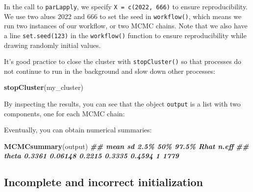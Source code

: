 \documentclass[
  12pt,
]{krantz}
\newenvironment{Shaded}{\begin{snugshade}}{\end{snugshade}}
\newcommand{\DocumentationTok}[1]{\textcolor[rgb]{0.56,0.35,0.01}{\textbf{\textit{#1}}}}
\newcommand{\FunctionTok}[1]{\textcolor[rgb]{0.13,0.29,0.53}{\textbf{#1}}}
\newcommand{\NormalTok}[1]{#1}
\begin{document}
In the call to \texttt{parLapply}, we specify \texttt{X\ =\ c(2022,\ 666)} to ensure reproducibility. We use two alues 2022 and 666 to set the seed in \texttt{workflow()}, which means we run two instances of our workflow, or two MCMC chains. Note that we also have a line \texttt{set.seed(123)} in the \texttt{workflow()} function to ensure reproducibility while drawing randomly initial values.

It's good practice to close the cluster with \texttt{stopCluster()} so that processes do not continue to run in the background and slow down other processes:

\begin{Shaded}
\begin{Highlighting}[]
\FunctionTok{stopCluster}\NormalTok{(my\_cluster)}
\end{Highlighting}
\end{Shaded}

By inspecting the results, you can see that the object \texttt{output} is a list with two components, one for each MCMC chain:

\begin{Shaded}
\end{Shaded}

Eventually, you can obtain numerical summaries:

\begin{Shaded}
\begin{Highlighting}[]
\FunctionTok{MCMCsummary}\NormalTok{(output)}
\DocumentationTok{\#\#         mean      sd   2.5\%    50\%  97.5\% Rhat n.eff}
\DocumentationTok{\#\# theta 0.3361 0.06148 0.2215 0.3335 0.4594    1  1779}
\end{Highlighting}
\end{Shaded}

\subsection{Incomplete and incorrect initialization}\label{incomplete-and-incorrect-initialization}
\end{document}
